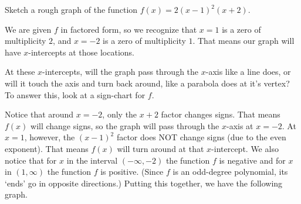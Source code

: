 \documentclass{ximera}
\begin{document}
\begin{example}
	Sketch a rough graph of the function $f(x) = 2(x-1)^2(x+2)$.

	\begin{explanation}
		We are given $f$ in factored form, so we recognize that $x=1$ is a zero of multiplicity $2$, and $x=-2$ is a zero of multiplicity $1$.
		That means our graph will have $x$-intercepts at those locations.
		
		At these $x$-intercepts, will the graph pass through the $x$-axis like a line does, or will it touch the axis and turn back
		around, like a parabola does at it's vertex?  To answer this, look at a sign-chart for $f$.

		\begin{center}
		\end{center}
		
		Notice that around $x=-2$, only the $x+2$ factor changes signs.  That means $f(x)$ will change signs, so the graph will pass through the $x$-axis at $x=-2$.
		At $x=1$, however, the $(x-1)^2$ factor does NOT change signs (due to the even exponent).  That means $f(x)$ will turn around at that $x$-intercept.  
		We also notice that for $x$ in the interval $(-\infty, -2)$ the function $f$ is negative and for $x$ in $(1,\infty)$ the function $f$ is positive.
		(Since $f$ is an odd-degree polynomial, its `ends' go in opposite directions.) Putting this together, we have the following graph.
		
		\begin{center}
		\end{center}
	\end{explanation}
\end{example}
\end{document}
